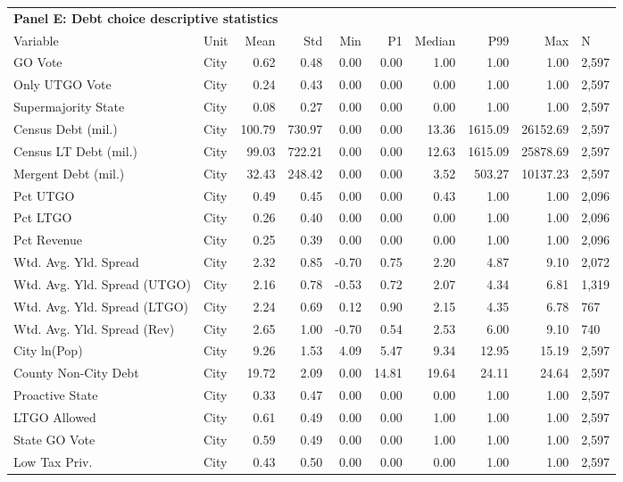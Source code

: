 \begin{table}[H]
\centering
\begin{tabular*}{\textwidth}{@{\extracolsep{\fill}}llrrrrrrrl}
\multicolumn{10}{l}{\textbf{Panel E: Debt choice descriptive statistics}}\\

\addlinespace
  \toprule
Variable & Unit & Mean & Std & Min & P1 & Median & P99 & Max & N \\ 
  \hline
GO Vote & City & 0.62 & 0.48 & 0.00 & 0.00 & 1.00 & 1.00 & 1.00 & 2,597 \\ 
  Only UTGO Vote & City & 0.24 & 0.43 & 0.00 & 0.00 & 0.00 & 1.00 & 1.00 & 2,597 \\ 
  Supermajority State & City & 0.08 & 0.27 & 0.00 & 0.00 & 0.00 & 1.00 & 1.00 & 2,597 \\ 
  Census Debt (mil.) & City & 100.79 & 730.97 & 0.00 & 0.00 & 13.36 & 1615.09 & 26152.69 & 2,597 \\ 
  Census LT Debt (mil.) & City & 99.03 & 722.21 & 0.00 & 0.00 & 12.63 & 1615.09 & 25878.69 & 2,597 \\ 
  Mergent Debt (mil.) & City & 32.43 & 248.42 & 0.00 & 0.00 & 3.52 & 503.27 & 10137.23 & 2,597 \\ 
  Pct UTGO & City & 0.49 & 0.45 & 0.00 & 0.00 & 0.43 & 1.00 & 1.00 & 2,096 \\ 
  Pct LTGO & City & 0.26 & 0.40 & 0.00 & 0.00 & 0.00 & 1.00 & 1.00 & 2,096 \\ 
  Pct Revenue & City & 0.25 & 0.39 & 0.00 & 0.00 & 0.00 & 1.00 & 1.00 & 2,096 \\ 
  Wtd. Avg. Yld. Spread & City & 2.32 & 0.85 & -0.70 & 0.75 & 2.20 & 4.87 & 9.10 & 2,072 \\ 
  Wtd. Avg. Yld. Spread (UTGO) & City & 2.16 & 0.78 & -0.53 & 0.72 & 2.07 & 4.34 & 6.81 & 1,319 \\ 
  Wtd. Avg. Yld. Spread (LTGO) & City & 2.24 & 0.69 & 0.12 & 0.90 & 2.15 & 4.35 & 6.78 &   767 \\ 
  Wtd. Avg. Yld. Spread (Rev) & City & 2.65 & 1.00 & -0.70 & 0.54 & 2.53 & 6.00 & 9.10 &   740 \\ 
  City ln(Pop) & City & 9.26 & 1.53 & 4.09 & 5.47 & 9.34 & 12.95 & 15.19 & 2,597 \\ 
  County Non-City Debt & City & 19.72 & 2.09 & 0.00 & 14.81 & 19.64 & 24.11 & 24.64 & 2,597 \\ 
  Proactive State & City & 0.33 & 0.47 & 0.00 & 0.00 & 0.00 & 1.00 & 1.00 & 2,597 \\ 
  LTGO Allowed & City & 0.61 & 0.49 & 0.00 & 0.00 & 1.00 & 1.00 & 1.00 & 2,597 \\ 
  State GO Vote & City & 0.59 & 0.49 & 0.00 & 0.00 & 1.00 & 1.00 & 1.00 & 2,597 \\ 
  Low Tax Priv. & City & 0.43 & 0.50 & 0.00 & 0.00 & 0.00 & 1.00 & 1.00 & 2,597 \\ 
   \hline
\end{tabular*}
\end{table}
